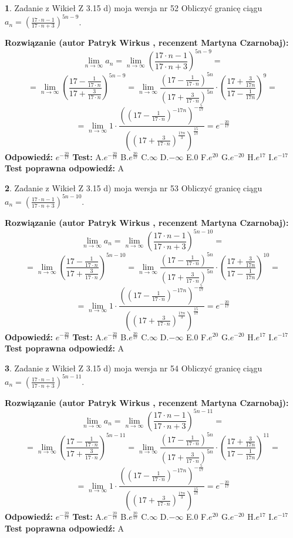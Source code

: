 \documentclass[12pt, a4paper]{article}
\theoremstyle{definition} %
\newtheorem{zad}{}
\newcommand{\zadStart}[1]{\begin{zad}#1\newline}
\newcommand{\zadStop}{\end{zad}}
\newcommand{\rozwStart}[2]{\noindent \textbf{Rozwiązanie (autor #1 , recenzent #2): }\newline}
\newcommand{\rozwStop}{\newline}
\newcommand{\odpStart}{\noindent \textbf{Odpowiedź:}\newline}
\newcommand{\odpStop}{\newline}
\newcommand{\testStart}{\noindent \textbf{Test:}\newline}
\newcommand{\testStop}{\newline}
\newcommand{\kluczStart}{\noindent \textbf{Test poprawna odpowiedź:}\newline}
\newcommand{\kluczStop}{\newline}
\begin{document}
\zadStart{Zadanie z Wikieł Z 3.15 d) moja wersja nr 52}
Obliczyć granicę ciągu $a_{n}=(\frac{17\cdot n - 1}{17 \cdot n + 3})^{5n-9}$.
\zadStop
\rozwStart{Patryk Wirkus}{Martyna Czarnobaj}
$$\lim\limits_{n\to\infty} a_{n} = \lim\limits_{n\to\infty}(\frac{17\cdot n - 1}{17 \cdot n + 3})^{5n-9}=$$
$$=\lim\limits_{n\to\infty}(\frac{17 - \frac{1}{17\cdot n}}{17 + \frac{3}{17 \cdot n}})^{5n-9}=\lim\limits_{n\to\infty}\frac{(17 - \frac{1}{17\cdot n})^{5n}}{(17 + \frac{3}{17\cdot n})^{5n}} \cdot (\frac{17+\frac{3}{17n}}{17-\frac{1}{17n}})^{9}=$$
$$=\lim\limits_{n\to\infty} 1 \cdot \frac{((17-\frac{1}{17 \cdot n})^{-17n})^{-\frac{5}{17}}}{((17+\frac{3}{17 \cdot n})^{\frac{17n}{3}})^{\frac{15}{17}}} =e^{-\frac{20}{17}}$$
\rozwStop
\odpStart
$e^{-\frac{20}{17}}$
\odpStop
\testStart
A.$ e^{-\frac{20}{17}}$
B.$ e^{\frac{20}{17}}$
C.$\infty$
D.$-\infty$
E.$0$
F.$e^{20}$
G.$e^{-20}$
H.$e^{17}$
I.$e^{-17}$
\testStop
\kluczStart
A
\kluczStop



\zadStart{Zadanie z Wikieł Z 3.15 d) moja wersja nr 53}
Obliczyć granicę ciągu $a_{n}=(\frac{17\cdot n - 1}{17 \cdot n + 3})^{5n-10}$.
\zadStop
\rozwStart{Patryk Wirkus}{Martyna Czarnobaj}
$$\lim\limits_{n\to\infty} a_{n} = \lim\limits_{n\to\infty}(\frac{17\cdot n - 1}{17 \cdot n + 3})^{5n-10}=$$
$$=\lim\limits_{n\to\infty}(\frac{17 - \frac{1}{17\cdot n}}{17 + \frac{3}{17 \cdot n}})^{5n-10}=\lim\limits_{n\to\infty}\frac{(17 - \frac{1}{17\cdot n})^{5n}}{(17 + \frac{3}{17\cdot n})^{5n}} \cdot (\frac{17+\frac{3}{17n}}{17-\frac{1}{17n}})^{10}=$$
$$=\lim\limits_{n\to\infty} 1 \cdot \frac{((17-\frac{1}{17 \cdot n})^{-17n})^{-\frac{5}{17}}}{((17+\frac{3}{17 \cdot n})^{\frac{17n}{3}})^{\frac{15}{17}}} =e^{-\frac{20}{17}}$$
\rozwStop
\odpStart
$e^{-\frac{20}{17}}$
\odpStop
\testStart
A.$ e^{-\frac{20}{17}}$
B.$ e^{\frac{20}{17}}$
C.$\infty$
D.$-\infty$
E.$0$
F.$e^{20}$
G.$e^{-20}$
H.$e^{17}$
I.$e^{-17}$
\testStop
\kluczStart
A
\kluczStop



\zadStart{Zadanie z Wikieł Z 3.15 d) moja wersja nr 54}
Obliczyć granicę ciągu $a_{n}=(\frac{17\cdot n - 1}{17 \cdot n + 3})^{5n-11}$.
\zadStop
\rozwStart{Patryk Wirkus}{Martyna Czarnobaj}
$$\lim\limits_{n\to\infty} a_{n} = \lim\limits_{n\to\infty}(\frac{17\cdot n - 1}{17 \cdot n + 3})^{5n-11}=$$
$$=\lim\limits_{n\to\infty}(\frac{17 - \frac{1}{17\cdot n}}{17 + \frac{3}{17 \cdot n}})^{5n-11}=\lim\limits_{n\to\infty}\frac{(17 - \frac{1}{17\cdot n})^{5n}}{(17 + \frac{3}{17\cdot n})^{5n}} \cdot (\frac{17+\frac{3}{17n}}{17-\frac{1}{17n}})^{11}=$$
$$=\lim\limits_{n\to\infty} 1 \cdot \frac{((17-\frac{1}{17 \cdot n})^{-17n})^{-\frac{5}{17}}}{((17+\frac{3}{17 \cdot n})^{\frac{17n}{3}})^{\frac{15}{17}}} =e^{-\frac{20}{17}}$$
\rozwStop
\odpStart
$e^{-\frac{20}{17}}$
\odpStop
\testStart
A.$ e^{-\frac{20}{17}}$
B.$ e^{\frac{20}{17}}$
C.$\infty$
D.$-\infty$
E.$0$
F.$e^{20}$
G.$e^{-20}$
H.$e^{17}$
I.$e^{-17}$
\testStop
\kluczStart
A
\kluczStop
\end{document}
